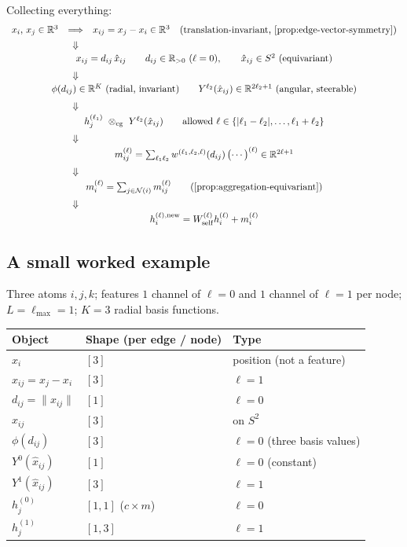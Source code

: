 \documentclass[11pt,a4paper]{report}
\theoremstyle{definition}
\theoremstyle{remark}
\newcommand{\RR}{\mathbb R}
\begin{document}
Collecting everything:
\[
\begin{array}{rcl}
x_i,\,x_j\in\RR^3 & \Longrightarrow & x_{ij}=x_j-x_i\in\RR^3
\quad\text{(translation-invariant, \Cref{prop:edge-vector-symmetry})}\\[4pt]
&\Downarrow&\\[2pt]
\multicolumn{3}{c}{x_{ij}=d_{ij}\,\hat x_{ij}
\qquad d_{ij}\in\RR_{>0}\ (\ell=0),
\qquad \hat x_{ij}\in S^2\ (\text{equivariant})}\\[6pt]
&\Downarrow&\\[2pt]
\multicolumn{3}{c}{
\phi(d_{ij})\in\RR^{K}\ \text{(radial, invariant)}
\qquad
Y^{\ell_2}(\hat x_{ij})\in\RR^{2\ell_2+1}\ \text{(angular, steerable)}}\\[6pt]
&\Downarrow&\\[2pt]
\multicolumn{3}{c}{h^{(\ell_1)}_j\ \otimes_{\mathrm{cg}}\ Y^{\ell_2}(\hat x_{ij})
\qquad\text{allowed } \ell\in\{|\ell_1-\ell_2|,\dots,\ell_1+\ell_2\}}\\[6pt]
&\Downarrow&\\[2pt]
\multicolumn{3}{c}{m^{(\ell)}_{ij}
= \sum_{\ell_1\ell_2} w^{(\ell_1,\ell_2,\ell)}(d_{ij})\,\bigl(\cdots\bigr)^{(\ell)}
\in\RR^{2\ell+1}}\\[6pt]
&\Downarrow&\\[2pt]
\multicolumn{3}{c}{m^{(\ell)}_i=\sum_{j\in\mathcal N(i)}m^{(\ell)}_{ij}
\qquad\text{(\Cref{prop:aggregation-equivariant})}}\\[6pt]
&\Downarrow&\\[2pt]
\multicolumn{3}{c}{h^{(\ell),\mathrm{new}}_i = W^{(\ell)}_{\mathrm{self}}h^{(\ell)}_i + m^{(\ell)}_i}
\end{array}
\]

\subsection{A small worked example}
\label{sec:mp-worked-example}

Three atoms $i,j,k$; features $1$ channel of $\ell=0$ and $1$ channel of
$\ell=1$ per node; $L=\ell_{\max}=1$; $K=3$ radial basis functions.

\begin{center}
\begin{tabular}{lll}
\toprule
Object & Shape (per edge / node) & Type \\
\midrule
$x_i$ & $[3]$ & position (not a feature) \\
$x_{ij}=x_j-x_i$ & $[3]$ & $\ell=1$ \\
$d_{ij}=\|x_{ij}\|$ & $[1]$ & $\ell=0$ \\
$\hat x_{ij}$ & $[3]$ & on $S^2$ \\
$\phi(d_{ij})$ & $[3]$ & $\ell=0$ (three basis values) \\
$Y^0(\hat x_{ij})$ & $[1]$ & $\ell=0$ (constant) \\
$Y^1(\hat x_{ij})$ & $[3]$ & $\ell=1$ \\
$h^{(0)}_j$ & $[1,1]$ ($c\times m$) & $\ell=0$ \\
$h^{(1)}_j$ & $[1,3]$ & $\ell=1$ \\
\bottomrule
\end{tabular}
\end{center}
\end{document}
